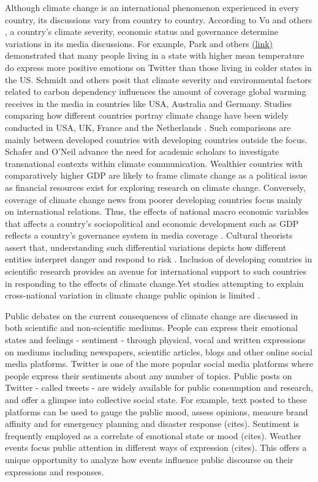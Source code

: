 \documentclass{article}
\begin{document}
Although climate change is an international phenomenon experienced in every country, its discussions vary from country to country. According to Vu and others \cite{vu_nationalizing_2019}, a country’s climate severity, economic status and governance determine variations in its media discussions. For example, Park and others \cite{park_mood_2013} \href{https://pdfs.semanticscholar.org/b282/feb759e57530b115dcc4bb080f96598a5246.pdf}{(link)} demonstrated that many people living in a state with higher mean temperature do express more positive emotions on Twitter than those living in colder states in the US. Schmidt and others \cite{schmidt_media_2013} posit that climate severity and environmental factors related to carbon dependency influences the amount of coverage global warming receives in the media in countries like USA, Australia and Germany. Studies comparing how different countries portray climate change have been widely conducted in USA, UK, France and the Netherlands \cite{vu_nationalizing_2019}. Such comparisons are mainly between developed countries with developing countries outside the focus.  Schafer and O’Neil \cite{schafer_what_2013} advance the need for academic scholars to investigate transnational contexts within climate communication. Wealthier countries with comparatively higher GDP are likely to frame climate change as a political issue as financial resources exist for exploring research on climate change. Conversely, coverage of climate change news from poorer developing countries focus mainly on international relations. Thus, the effects of national macro economic variables that affects a country’s sociopolitical and economic development such as GDP reflects a country’s governance system in media coverage \cite{vu_what_2018}. Cultural theorists assert that, understanding such differential variations depicts how different entities interpret danger and respond to risk \cite{tansey_cultural_1999}. Inclusion of developing countries in scientific research provides an avenue for international support to such countries in responding to the effects of climate change.Yet studies attempting to explain cross-national variation in climate change public opinion is limited \cite{knight_public_2016}.

Public debates on the current consequences of climate change are discussed in both scientific and non-scientific mediums. People can express their emotional states and feelings - sentiment - through physical, vocal and written expressions on mediums including newspapers, scientific articles, blogs and other online social media platforms. Twitter is one of the more popular social media platforms where people express their sentiments about any number of topics. Public posts on Twitter - called tweets - are widely available for public consumption and research, and offer a glimpse into collective social state. For example, text posted to these platforms can be used to gauge the public mood, assess opinions, measure brand affinity and for emergency planning and disaster response (cites). Sentiment is frequently employed as a correlate of emotional state or mood (cites). Weather events focus public attention in different ways of expression (cites). This offers a unique opportunity to analyze how events influence public discourse on their expressions and responses.
\end{document}
